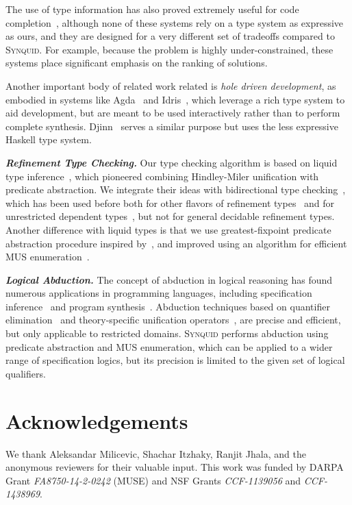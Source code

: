 \documentclass[10pt,preprint]{sigplanconf-pldi16}
\theoremstyle{definition}
\newcommand{\custompar}[1]{\parskip 0pt \textbf{\textit{#1}}}
\newcommand{\tool}{\textsc{Synquid}\xspace}
\begin{document}
The use of type information has also proved extremely useful for code completion~\cite{MandelinXuBoKi05,PerelmanGuBaGr12,GveroKuKuPi13}, 
although none of these systems rely on a type system as expressive as ours, 
and they are designed for a very different set of tradeoffs compared to \tool. 
For example, because the problem is highly under-constrained, these systems place significant emphasis on the ranking of solutions.

Another important body of related work related is \emph{hole driven development}, 
as embodied in systems like Agda~\cite{Norell09} and Idris~\cite{Brady13}, 
which leverage a rich type system to aid development, 
but are meant to be used interactively rather than to perform complete synthesis. 
Djinn~\cite{Augustsson14} serves a similar purpose but uses the less expressive Haskell type system.


\custompar{Refinement Type Checking.}
Our type checking algorithm is based on liquid type inference~\cite{RondonKaJh08,KawaguchiRoJh09,VazouRoJh13,VazouSeJh14,VazouSeJhVyJo14},
which pioneered combining Hindley-Miler unification with predicate abstraction.
We integrate their ideas with bidirectional type checking~\cite{PierceTu00}, which has been used before both 
for other flavors of refinement types~\cite{XiPf99,DaviesPf00,DunfieldPf04} and for unrestricted dependent types~\cite{Coquand96},
but not for general decidable refinement types.
Another difference with liquid types is that we use greatest-fixpoint predicate abstraction procedure inspired by~\cite{SrivastavaGu09},
and improved using an algorithm for efficient MUS enumeration~\cite{LiffitonPrMaMa15}.

\custompar{Logical Abduction.}
The concept of abduction in logical reasoning has found numerous applications in programming languages,
including specification inference~\cite{DilligDLM13,AlbarghouthiDG16} and program synthesis~\cite{KneussKuKuSu13,LeinoMi12,AlurCR15}.
Abduction techniques based on quantifier elimination~\cite{DilligDLM13,AlbarghouthiDG16}
and theory-specific unification operators~\cite{AlurCR15},
are precise and efficient, but only applicable to restricted domains.
\tool performs abduction using predicate abstraction and MUS enumeration,
which can be applied to a wider range of specification logics,
but its precision is limited to the given set of logical qualifiers.


\section*{Acknowledgements}
We thank Aleksandar Milicevic, Shachar Itzhaky, Ranjit Jhala, and the anonymous reviewers for their valuable input. 
This work was funded by DARPA Grant \textsl{FA8750-14-2-0242} (MUSE) and NSF Grants \textsl{CCF-1139056} and \textsl{CCF-1438969}.
\end{document}

